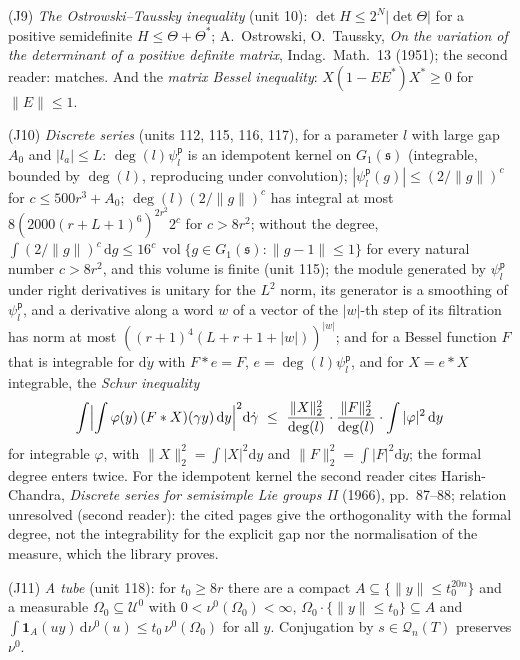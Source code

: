 \documentclass[11pt,a4paper]{article}
\theoremstyle{plainx}
\theoremstyle{uprightx}
\newcommand{\dd}{\mathrm{d}}
\newcommand{\Ql}[2]{\mathcal{Q}_{#1}(#2)}
\newcommand{\vol}{\operatorname{vol}}
\newcommand{\Gone}[1]{G_1(#1)}
\newcommand{\Inp}[1]{\textup{(#1)}}
\newcommand{\muz}{\nu^{0}}
\begin{document}
\Inp{J9} \emph{The Ostrowski--Taussky inequality} (unit 10): $\det H\le2^{N}|\det\Theta|$ for a positive semidefinite
$H\le\Theta+\Theta^{*}$; A.~Ostrowski, O.~Taussky, \emph{On the variation of the determinant of a positive definite
matrix}, Indag.\ Math.\ 13 (1951); the second reader: matches. And the \emph{matrix Bessel inequality}:
$X(1-EE^{*})X^{*}\ge0$ for $\|E\|\le1$.

\Inp{J10} \emph{Discrete series} (units 112, 115, 116, 117), for a parameter $l$ with large gap $A_0$ and $|l_a|\le L$:
$\deg(l)\psi^{\mathsf{p}}_l$ is an idempotent kernel on $\Gone{\mathfrak{s}}$ (integrable, bounded by $\deg(l)$, reproducing under
convolution); $|\psi^{\mathsf{p}}_l(g)|\le(2/\|g\|)^{c}$ for $c\le500r^{3}+A_0$; $\deg(l)(2/\|g\|)^{c}$ has integral at most
$8(2000(r+L+1)^{6})^{2r^{2}}2^{c}$ for $c>8r^{2}$; without the degree,
$\int(2/\|g\|)^{c}\,\dd g\le16^{c}\,\vol\{g\in\Gone{\mathfrak{s}}:\|g-1\|\le1\}$ for every natural number $c>8r^{2}$, and
this volume is finite (unit 115); the module generated by $\psi^{\mathsf{p}}_l$ under right derivatives is
unitary for the $L^2$ norm, its generator is a smoothing of $\psi^{\mathsf{p}}_l$, and a derivative along a word $w$ of a vector
of the $|w|$-th step of its filtration has norm at most $((r+1)^{4}(L+r+1+|w|))^{|w|}$; and for a Bessel function
$F$ that is integrable for $\dd\dot y$ with $F*e=F$, $e=\deg(l)\psi^{\mathsf{p}}_l$, and for $X=e*X$ integrable, the
\emph{Schur inequality}
\[\int\Bigl|\int\varphi(y)\,(F*X)(\gamma y)\,\dd y\Bigr|^{2}\dd\dot\gamma\ \le\
\frac{\|X\|_2^{2}}{\deg(l)}\cdot\frac{\|F\|_2^{2}}{\deg(l)}\cdot\int|\varphi|^{2}\,\dd y\]
for integrable $\varphi$, with $\|X\|_2^{2}=\int|X|^{2}\dd y$ and $\|F\|_2^{2}=\int|F|^{2}\dd\dot y$; the formal degree
enters twice. For the idempotent kernel the second reader cites Harish-Chandra, \emph{Discrete series for
semisimple Lie groups II} (1966), pp.~87--88; relation unresolved (second reader): the cited pages give the
orthogonality with the formal degree, not the integrability for the explicit gap nor the normalisation of the
measure, which the library proves.

\Inp{J11} \emph{A tube} (unit 118): for $t_0\ge8r$ there are a compact $A\subseteq\{\|y\|\le t_0^{20n}\}$ and a
measurable $\Omega_0\subseteq\mathcal{U}^0$ with $0<\muz(\Omega_0)<\infty$,
$\Omega_0\cdot\{\|y\|\le t_0\}\subseteq A$ and $\int\mathbf{1}_A(uy)\,\dd\muz(u)\le t_0\,\muz(\Omega_0)$ for all $y$.
Conjugation by $s\in\Ql{n}{T}$ preserves $\muz$.
\end{document}
